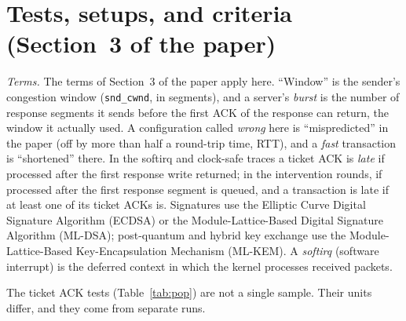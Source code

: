 \documentclass[9pt]{article}
\begin{document}
\section*{Tests, setups, and criteria (Section~3 of the paper)}
\emph{Terms.} The terms of Section~3 of the paper apply here. ``Window'' is the sender's congestion window (\texttt{snd\_cwnd}, in segments), and a server's \emph{burst} is the number of response segments it sends before the first ACK of the response can return, the window it actually used. A configuration called \emph{wrong} here is ``mispredicted'' in the paper (off by more than half a round-trip time, RTT), and a \emph{fast} transaction is ``shortened'' there. In the softirq and clock-safe traces a ticket ACK is \emph{late} if processed after the first response write returned; in the intervention rounds, if processed after the first response segment is queued, and a transaction is late if at least one of its ticket ACKs is. Signatures use the Elliptic Curve Digital Signature Algorithm (ECDSA) or the Module-Lattice-Based Digital Signature Algorithm (ML-DSA); post-quantum and hybrid key exchange use the Module-Lattice-Based Key-Encapsulation Mechanism (ML-KEM). A \emph{softirq} (software interrupt) is the deferred context in which the kernel processes received packets.

The ticket ACK tests (Table~\ref{tab:pop}) are not a single sample. Their units differ, and they come from separate runs.
\end{document}
